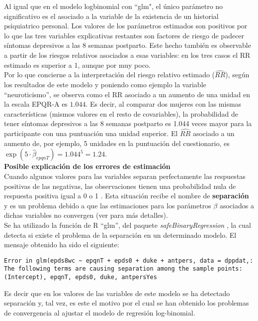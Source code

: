 Al igual que en el modelo logbinomial con ``glm", el único parámetro no significativo es el asociado a la variable de la existencia de un historial psiquiatrico personal. Los valores de los parámetros estimados son positivos por lo que las tres variables explicativas restantes son factores de riesgo de padecer síntomas depresivos a las 8 semanas postparto. Este hecho también es observable a partir de los riesgos relativos asociados a esas variables: en los tres casos el RR estimado es superior a 1, aunque por muy poco.\\

Por lo que concierne a la interpretación del riesgo relativo estimado ($\widehat{RR}$), según los resultados de este modelo y poniendo como ejemplo la variable ``neuroticismo'', se observa como el RR asociado a un aumento de una unidad en la escala EPQR-A es $1.044$. Es decir, al comparar dos mujeres con las mismas características (mismos valores en el resto de covariables), la probabilidad de tener síntomas depresivos a las 8 semanas postparto es 1.044 veces mayor para la participante con una puntuación una unidad superior. El $\widehat{RR}$ asociado a un aumento de, por ejemplo, 5 unidades en la puntuación del cuestionario, es $\exp(5\cdot \hat{\beta}_{epqnT})=1.044^5=1.24$.\\

\textbf{Posible explicación de los errores de estimación}\\
[0.3cm]
Cuando algunos valores para las variables separan perfectamente las respuestas positivas de las negativas, las observaciones tienen una probabilidad nula de respuesta positiva igual a 0 o 1 . Esta situación recibe el nombre de \textbf{separación} y es un problema debido a que las estimaciones para los parámetros $\beta$ asociados a dichas variables no convergen (ver \textcite{separation} para más detalles). \\

Se ha utilizado la función de R ``glm'', del paquete \textit{safeBinaryRegression} \autocite{safebinary}, la cual detecta si existe el problema de la separación en un determinado modelo. El mensaje obtenido ha sido el siguiente: 
\begin{Verbatim}[formatcom=\color{Red},  xleftmargin=0.5cm]
Error in glm(epds8wc ~ epqnT + epds0 + duke + antpers, data = dppdat,: 
The following terms are causing separation among the sample points: 
(Intercept), epqnT, epds0, duke, antpersYes
\end{Verbatim}

Es decir que en los valores de las variables de este modelo se ha detectado separación y, tal vez, es este el motivo por el cual se han obtenido los problemas de convergencia al ajustar el modelo de regresión log-binomial.


